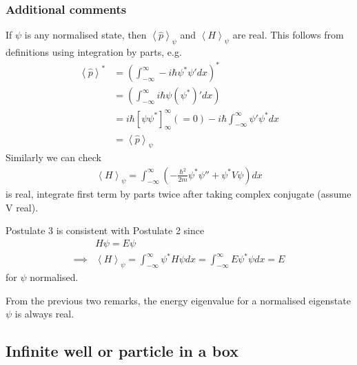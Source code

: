 \documentclass[a4paper]{article}
\begin{document}
\subsubsection{Additional comments}
\begin{rem}
If $\psi$ is any normalised state, then $\left<\hat{p}\right>_\psi$ and $\left<H\right>_\psi$ are real. This follows from definitions using integration by parts, e.g.
\begin{equation*}
\begin{aligned}
\left<\hat{p}\right>^* &= \left(\int_{-\infty}^\infty -i\hbar \psi^* \psi' dx\right)^* \\
&= \left(\int_{-\infty}^\infty i\hbar \psi\left(\psi^*\right)' dx\right)\\
&= i\hbar \left[\psi \psi^*\right]_{\infty}^\infty (=0) - i\hbar \int_{-\infty}^\infty \psi'\psi^* dx\\
&= \left<\hat{p}\right>_\psi
\end{aligned}
\end{equation*}
Similarly we can check
\begin{equation*}
\begin{aligned}
\left<H\right>_\psi = \int_{-\infty}^\infty \left(-\frac{\hbar^2}{2m} \psi^* \psi'' + \psi^* V \psi\right) dx
\end{aligned}
\end{equation*}
is real, integrate first term by parts twice after taking complex conjugate (assume V real).
\end{rem}

\begin{rem}
Postulate 3 is consistent with Postulate 2 since
\begin{equation*}
\begin{aligned}
&H\psi = E\psi\\
\implies & \left<H\right>_\psi = \int_{-\infty}^\infty \psi^* H \psi dx = \int_{-\infty}^\infty E \psi^* \psi dx = E
\end{aligned}
\end{equation*}
for $\psi$ normalised.
\end{rem}

\begin{rem}
From the previous two remarks, the energy eigenvalue for a normalised eigenstate $\psi$ is always real.
\end{rem}

\subsection{Infinite well or particle in a box}
\end{document}
